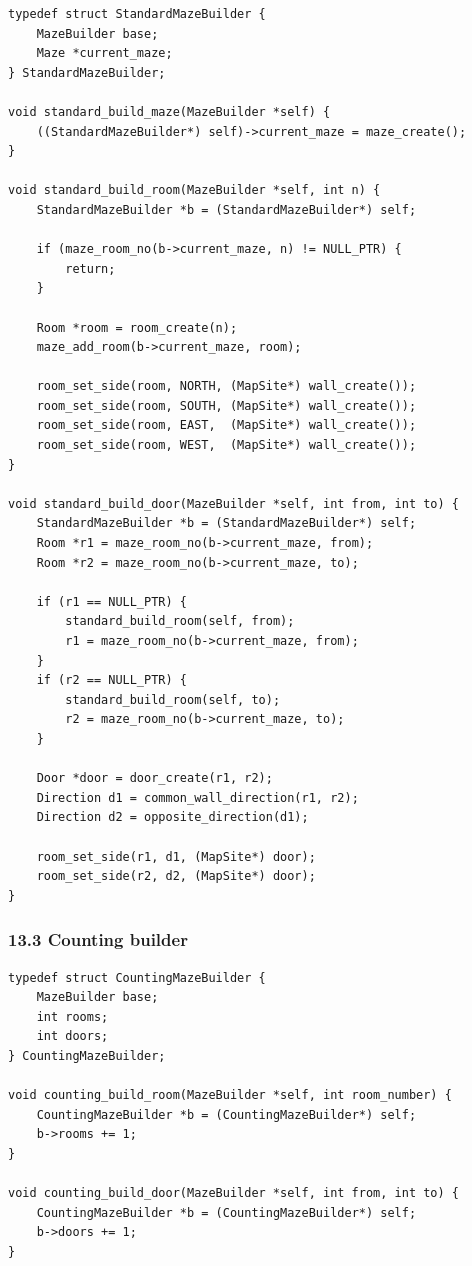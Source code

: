 \documentclass[11pt]{article}
\begin{document}
\begin{verbatim}
typedef struct StandardMazeBuilder {
    MazeBuilder base;
    Maze *current_maze;
} StandardMazeBuilder;

void standard_build_maze(MazeBuilder *self) {
    ((StandardMazeBuilder*) self)->current_maze = maze_create();
}

void standard_build_room(MazeBuilder *self, int n) {
    StandardMazeBuilder *b = (StandardMazeBuilder*) self;

    if (maze_room_no(b->current_maze, n) != NULL_PTR) {
        return;
    }

    Room *room = room_create(n);
    maze_add_room(b->current_maze, room);

    room_set_side(room, NORTH, (MapSite*) wall_create());
    room_set_side(room, SOUTH, (MapSite*) wall_create());
    room_set_side(room, EAST,  (MapSite*) wall_create());
    room_set_side(room, WEST,  (MapSite*) wall_create());
}

void standard_build_door(MazeBuilder *self, int from, int to) {
    StandardMazeBuilder *b = (StandardMazeBuilder*) self;
    Room *r1 = maze_room_no(b->current_maze, from);
    Room *r2 = maze_room_no(b->current_maze, to);

    if (r1 == NULL_PTR) {
        standard_build_room(self, from);
        r1 = maze_room_no(b->current_maze, from);
    }
    if (r2 == NULL_PTR) {
        standard_build_room(self, to);
        r2 = maze_room_no(b->current_maze, to);
    }

    Door *door = door_create(r1, r2);
    Direction d1 = common_wall_direction(r1, r2);
    Direction d2 = opposite_direction(d1);

    room_set_side(r1, d1, (MapSite*) door);
    room_set_side(r2, d2, (MapSite*) door);
}
\end{verbatim}

\subsubsection{13.3 Counting builder}\label{counting-builder}

\begin{verbatim}
typedef struct CountingMazeBuilder {
    MazeBuilder base;
    int rooms;
    int doors;
} CountingMazeBuilder;

void counting_build_room(MazeBuilder *self, int room_number) {
    CountingMazeBuilder *b = (CountingMazeBuilder*) self;
    b->rooms += 1;
}

void counting_build_door(MazeBuilder *self, int from, int to) {
    CountingMazeBuilder *b = (CountingMazeBuilder*) self;
    b->doors += 1;
}
\end{verbatim}
\end{document}
